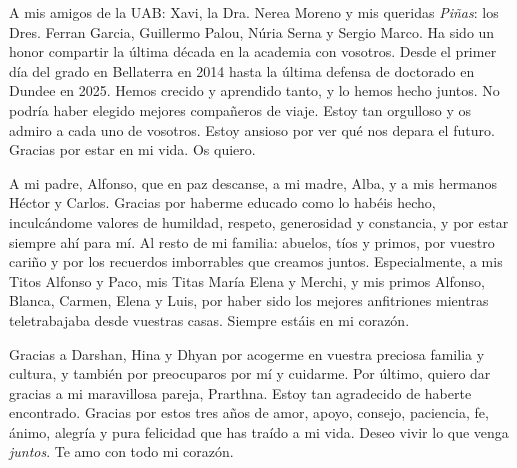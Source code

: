 A mis amigos de la UAB: Xavi, la Dra. Nerea Moreno y mis queridas \textit{Piñas}: los Dres. Ferran Garcia, Guillermo Palou, Núria Serna y Sergio Marco. Ha sido un honor compartir la última década en la academia con vosotros. Desde el primer día del grado en Bellaterra en 2014 hasta la última defensa de doctorado en Dundee en 2025. Hemos crecido y aprendido tanto, y lo hemos hecho juntos. No podría haber elegido mejores compañeros de viaje. Estoy tan orgulloso y os admiro a cada uno de vosotros. Estoy ansioso por ver qué nos depara el futuro. Gracias por estar en mi vida. Os quiero.

A mi padre, Alfonso, que en paz descanse, a mi madre, Alba, y a mis hermanos Héctor y Carlos. Gracias por haberme educado como lo habéis hecho, inculcándome valores de humildad, respeto, generosidad y constancia, y por estar siempre ahí para mí. Al resto de mi familia: abuelos, tíos y primos, por vuestro cariño y por los recuerdos imborrables que creamos juntos. Especialmente, a mis Titos Alfonso y Paco, mis Titas María Elena y Merchi, y mis primos Alfonso, Blanca, Carmen, Elena y Luis, por haber sido los mejores anfitriones mientras teletrabajaba desde vuestras casas. Siempre estáis en mi corazón.

Gracias a Darshan, Hina y Dhyan por acogerme en vuestra preciosa familia y cultura, y también por preocuparos por mí y cuidarme. Por último, quiero dar gracias a mi maravillosa pareja, Prarthna. Estoy tan agradecido de haberte encontrado. Gracias por estos tres años de amor, apoyo, consejo, paciencia, fe, ánimo, alegría y pura felicidad que has traído a mi vida. Deseo vivir lo que venga \textit{juntos}. Te amo con todo mi corazón.
